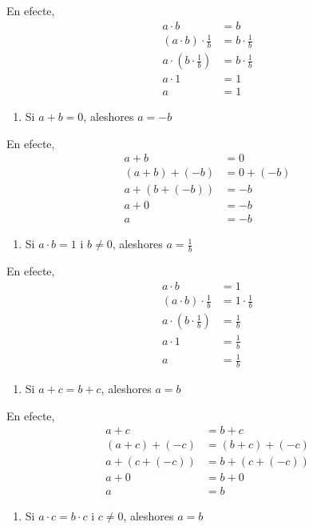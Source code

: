 En efecte,%
\begin{align*}
a\cdot b &=b \\
(a\cdot b)\cdot \frac{1}{b} &=b\cdot \frac{1}{b} \\
a\cdot \left( b\cdot \frac{1}{b}\right) &=b\cdot \frac{1}{b} \\
a\cdot 1 &=1 \\
a &=1
\end{align*}

\begin{enumerate}
\item[3.] Si $a+b=0$, aleshores $a=-b$
\end{enumerate}

En efecte,%
\begin{align*}
a+b &=0 \\
(a+b)+(-b) &=0+(-b) \\
a+(b+(-b)) &=-b \\
a+0 &=-b \\
a &=-b
\end{align*}

\begin{enumerate}
\item[4.] Si $a\cdot b=1$ i $b\neq 0$, aleshores $a=\frac{1}{b}$
\end{enumerate}

En efecte,%
\begin{align*}
a\cdot b &=1 \\
(a\cdot b)\cdot \frac{1}{b} &=1\cdot \frac{1}{b} \\
a\cdot \left( b\cdot \frac{1}{b}\right) &=\frac{1}{b} \\
a\cdot 1 &=\frac{1}{b} \\
a &=\frac{1}{b}
\end{align*}

\begin{enumerate}
\item[5.] Si $a+c=b+c$, aleshores $a=b$
\end{enumerate}

En efecte,%
\begin{align*}
a+c &=b+c \\
(a+c)+(-c) &=(b+c)+(-c) \\
a+(c+(-c)) &=b+(c+(-c)) \\
a+0 &=b+0 \\
a &=b
\end{align*}

\begin{enumerate}
\item[6.] Si $a\cdot c=b\cdot c$ i $c\neq 0$, aleshores $a=b$
\end{enumerate}

